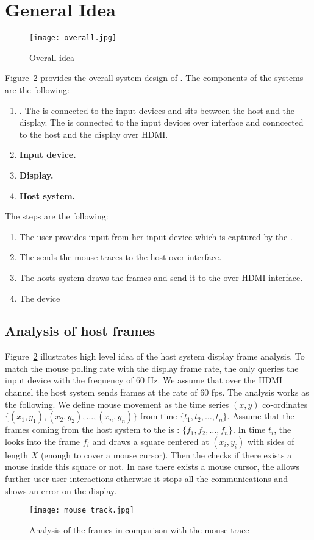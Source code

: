 \section{General Idea}

\begin{figure}
\centering
\texttt{[image: overall.jpg]}
\caption{Overall idea}
\label{fig:overallIdea}
\centering
\end{figure}


Figure~\ref{fig:overallIdea} provides the overall system design of \name. The components of the systems are the following:

\begin{enumerate}
  \item \textbf{\device.} The \device is connected to the input devices and sits between the host and the display. The \device is connected to the input devices over \usb interface and conncected to the host and the display over HDMI.
  \item \textbf{Input device.}
  \item \textbf{Display.}
  \item \textbf{Host system.}
\end{enumerate}

The steps are the following:

\begin{enumerate}
  \item The user provides input from her input device which is captured by the \device.
  \item The \device sends the mouse traces to the host over \bluetooth interface.
  \item The hosts system draws the frames and send it to the \device over HDMI interface.
  \item The device
\end{enumerate}

\subsection{Analysis of host frames}

Figure~\ref{fig:overallIdea} illustrates high level idea of the host system display frame analysis. To match the mouse polling rate with the display frame rate, the \device only queries the input device with the frequency of $60$ Hz. We assume that over the HDMI channel the host system sends frames at the rate  of $60$ fps. The analysis works as the following. We define mouse movement as the time series $(x,y)$ co-ordinates $\{(x_1,y_1), (x_2, y_2), \ldots, (x_n,y_n)\}$ from time $\{t_1, t_2, \ldots, t_n\}$. Assume that the frames coming from the host system to the \device is : $\{f_1, f_2, \ldots, f_n\}$. In time $t_i$, the \device looks into the frame $f_i$ and draws a square centered at $(x_i, y_i)$ with sides of length $X$ (enough to cover a mouse cursor). Then the \device checks if there exists a mouse inside this square or not. In case there exists a mouse cursor, the \device allows further user user interactions otherwise it stops all the communications and shows an error on the display.


\begin{figure}
\centering
\texttt{[image: mouse\_track.jpg]}
\caption{Analysis of the frames in comparison with the mouse trace}
\label{fig:overallIdea}
\centering
\end{figure}

